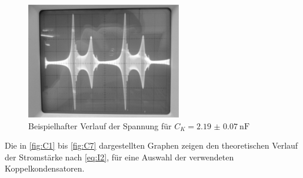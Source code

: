 		
	
	\begin{figure}
			\centering
			\includegraphics[scale=0.8]{Grafiken/Kondensator2.jpg}
			\caption{Beispielhafter Verlauf der Spannung für $C_{K} = \SI{2.19(7)}{\nano\farad}$ }
			\label{fig:WobbelVerlauf}
	\end{figure}
	
	Die in \cref{fig:C1} bis \ref{fig:C7} dargestellten Graphen zeigen den theoretischen Verlauf der Stromstärke nach 
	\cref{eq:I2}, für eine Auswahl der verwendeten Koppelkondensatoren.


%		
%	
%	
		
